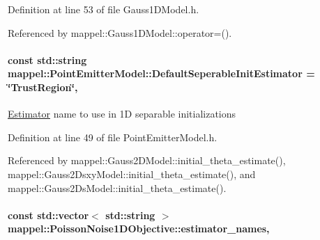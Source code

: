 Definition at line 53 of file Gauss1\+D\+Model.\+h.



Referenced by mappel\+::\+Gauss1\+D\+Model\+::operator=().

\paragraph[{\texorpdfstring{Default\+Seperable\+Init\+Estimator}{DefaultSeperableInitEstimator}}]{\setlength{\rightskip}{0pt plus 5cm}const std\+::string mappel\+::\+Point\+Emitter\+Model\+::\+Default\+Seperable\+Init\+Estimator = \char`\"{}Trust\+Region\char`\"{}\hspace{0.3cm}{\ttfamily [static]}, {\ttfamily [inherited]}}\hypertarget{classmappel_1_1PointEmitterModel_ad8c3dc629d75d22f25855a5f1ba8729f}{}\label{classmappel_1_1PointEmitterModel_ad8c3dc629d75d22f25855a5f1ba8729f}
\hyperlink{classmappel_1_1Estimator}{Estimator} name to use in 1D separable initializations 

Definition at line 49 of file Point\+Emitter\+Model.\+h.



Referenced by mappel\+::\+Gauss2\+D\+Model\+::initial\+\_\+theta\+\_\+estimate(), mappel\+::\+Gauss2\+Dsxy\+Model\+::initial\+\_\+theta\+\_\+estimate(), and mappel\+::\+Gauss2\+Ds\+Model\+::initial\+\_\+theta\+\_\+estimate().

\paragraph[{\texorpdfstring{estimator\+\_\+names}{estimator_names}}]{\setlength{\rightskip}{0pt plus 5cm}const std\+::vector$<$ std\+::string $>$ mappel\+::\+Poisson\+Noise1\+D\+Objective\+::estimator\+\_\+names\hspace{0.3cm}{\ttfamily [static]}, {\ttfamily [inherited]}}\hypertarget{classmappel_1_1PoissonNoise1DObjective_a985200133fb3e5bfdf8755296cf700eb}{}\label{classmappel_1_1PoissonNoise1DObjective_a985200133fb3e5bfdf8755296cf700eb}


